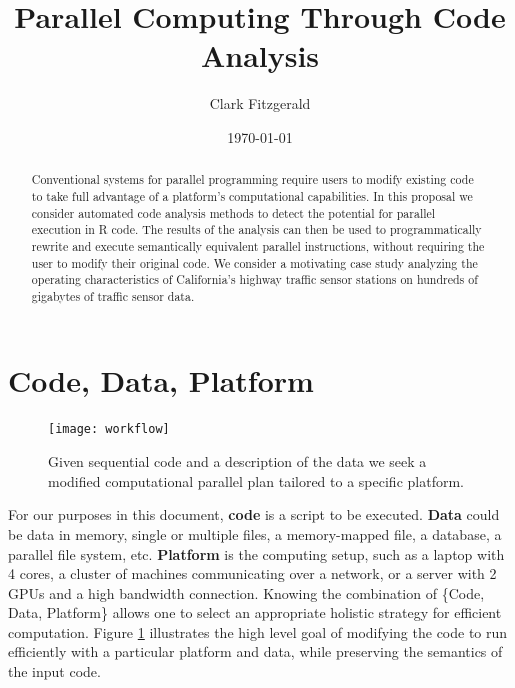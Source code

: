\documentclass[12pt]{article}
\begin{document}
\title{Parallel Computing Through Code Analysis}
\date{\today}
\author{Clark Fitzgerald}
\maketitle

\begin{abstract}


    Conventional systems for parallel programming require users to modify
    existing code to take full advantage of a platform's computational
    capabilities. In this proposal we consider automated code analysis
    methods to detect the potential for parallel execution in R code. The results of
    the analysis can then be used to programmatically rewrite and execute
    semantically equivalent parallel instructions, without requiring the
    user to modify their original code. We consider a motivating case
    study analyzing the operating characteristics of California's highway
    traffic sensor stations on hundreds of gigabytes of traffic sensor
    data.

\end{abstract}

\section{Code, Data, Platform}

\begin{figure}
\centering
\texttt{[image: workflow]}
\caption{Given sequential code and a description of the data we seek
    a modified computational parallel plan tailored to a specific platform.}
\label{fig:workflow}
\end{figure}

For our purposes in this document, \textbf{code} is a script to be
executed.  \textbf{Data} could be data in memory, single or multiple files,
a memory-mapped file, a database, a parallel file system, etc.
\textbf{Platform} is the computing setup, such as a laptop with 4 cores, a
cluster of machines communicating over a network, or a server with 2 GPUs
and a high bandwidth connection. Knowing the combination of \{Code, Data,
Platform\} allows one to select an appropriate holistic strategy for efficient
computation. Figure \ref{fig:workflow} illustrates the high level goal of
modifying the code to run efficiently with a particular platform and data,
while preserving the semantics of the input code.
\end{document}
